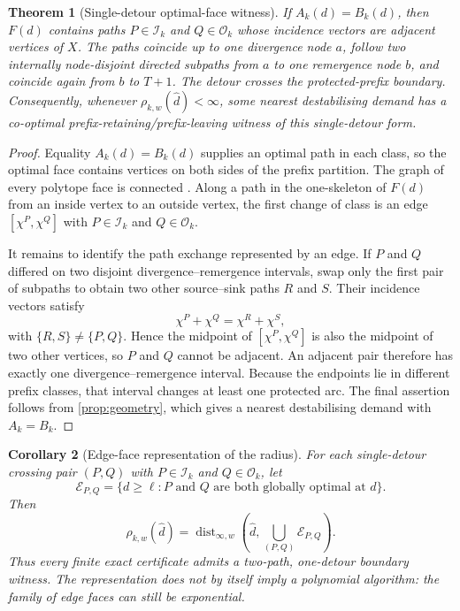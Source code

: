 \documentclass[11pt]{article}
\newtheorem{theorem}{Theorem}[section]
\newtheorem{corollary}[theorem]{Corollary}
\theoremstyle{definition}
\newcommand{\cI}{\mathcal{I}}
\newcommand{\cO}{\mathcal{O}}
\newcommand{\dhat}{\widehat d}
\newcommand{\ellv}{\ell}
\begin{document}
\begin{theorem}[Single-detour optimal-face witness]\label{thm:edgewitness}
If $A_k(d)=B_k(d)$, then $F(d)$ contains paths $P\in\cI_k$ and $Q\in\cO_k$ whose incidence vectors are adjacent vertices of $X$. The paths coincide up to one divergence node $a$, follow two internally node-disjoint directed subpaths from $a$ to one remergence node $b$, and coincide again from $b$ to $T+1$. The detour crosses the protected-prefix boundary. Consequently, whenever $\rho_{k,w}(\dhat)<\infty$, some nearest destabilising demand has a co-optimal prefix-retaining/prefix-leaving witness of this single-detour form.
\end{theorem}

\begin{proof}
Equality $A_k(d)=B_k(d)$ supplies an optimal path in each class, so the optimal face contains vertices on both sides of the prefix partition. The graph of every polytope face is connected 
\parencite[Ch.~3]{Ziegler1995}. Along a path in the one-skeleton of $F(d)$ from an inside vertex to an outside vertex, the first change of class is an edge $[\chi^P,\chi^Q]$ with $P\in\cI_k$ and $Q\in\cO_k$.

It remains to identify the path exchange represented by an edge. If $P$ and $Q$ differed on two disjoint divergence--remergence intervals, swap only the first pair of subpaths to obtain two other source--sink paths $R$ and $S$. Their incidence vectors satisfy
\[
\chi^P+\chi^Q=\chi^R+\chi^S,
\]
with $\{R,S\}\ne\{P,Q\}$. Hence the midpoint of $[\chi^P,\chi^Q]$ is also the midpoint of two other vertices, so $P$ and $Q$ cannot be adjacent. An adjacent pair therefore has exactly one divergence--remergence interval. Because the endpoints lie in different prefix classes, that interval changes at least one protected arc. The final assertion follows from \cref{prop:geometry}, which gives a nearest destabilising demand with $A_k=B_k$.
\end{proof}

\begin{corollary}[Edge-face representation of the radius]\label{cor:edgefaces}
For each single-detour crossing pair $(P,Q)$ with $P\in\cI_k$ and $Q\in\cO_k$, let
\[
\mathcal E_{P,Q}=\{d\ge\ellv:P\text{ and }Q\text{ are both globally optimal at }d\}.
\]
Then
\[
\rho_{k,w}(\dhat)=
\operatorname{dist}_{\infty,w}\!\left(
\dhat,
\bigcup_{(P,Q)}\mathcal E_{P,Q}
\right).
\]
Thus every finite exact certificate admits a two-path, one-detour boundary witness. The representation does not by itself imply a polynomial algorithm: the family of edge faces can still be exponential.
\end{corollary}
\end{document}
